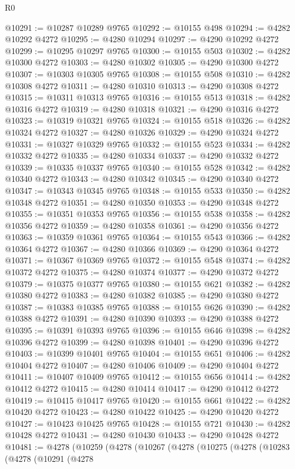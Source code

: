 \begin{lexlean}{R0}
\begin{coremodule}
@10291 := @10287 @10289 @9765
@10292 := @10155 @498
@10294 := @4282 @10292 @4272
@10295 := @4280 @10294
@10297 := @4290 @10292 @4272
@10299 := @10295 @10297 @9765
@10300 := @10155 @503
@10302 := @4282 @10300 @4272
@10303 := @4280 @10302
@10305 := @4290 @10300 @4272
@10307 := @10303 @10305 @9765
@10308 := @10155 @508
@10310 := @4282 @10308 @4272
@10311 := @4280 @10310
@10313 := @4290 @10308 @4272
@10315 := @10311 @10313 @9765
@10316 := @10155 @513
@10318 := @4282 @10316 @4272
@10319 := @4280 @10318
@10321 := @4290 @10316 @4272
@10323 := @10319 @10321 @9765
@10324 := @10155 @518
@10326 := @4282 @10324 @4272
@10327 := @4280 @10326
@10329 := @4290 @10324 @4272
@10331 := @10327 @10329 @9765
@10332 := @10155 @523
@10334 := @4282 @10332 @4272
@10335 := @4280 @10334
@10337 := @4290 @10332 @4272
@10339 := @10335 @10337 @9765
@10340 := @10155 @528
@10342 := @4282 @10340 @4272
@10343 := @4280 @10342
@10345 := @4290 @10340 @4272
@10347 := @10343 @10345 @9765
@10348 := @10155 @533
@10350 := @4282 @10348 @4272
@10351 := @4280 @10350
@10353 := @4290 @10348 @4272
@10355 := @10351 @10353 @9765
@10356 := @10155 @538
@10358 := @4282 @10356 @4272
@10359 := @4280 @10358
@10361 := @4290 @10356 @4272
@10363 := @10359 @10361 @9765
@10364 := @10155 @543
@10366 := @4282 @10364 @4272
@10367 := @4280 @10366
@10369 := @4290 @10364 @4272
@10371 := @10367 @10369 @9765
@10372 := @10155 @548
@10374 := @4282 @10372 @4272
@10375 := @4280 @10374
@10377 := @4290 @10372 @4272
@10379 := @10375 @10377 @9765
@10380 := @10155 @621
@10382 := @4282 @10380 @4272
@10383 := @4280 @10382
@10385 := @4290 @10380 @4272
@10387 := @10383 @10385 @9765
@10388 := @10155 @626
@10390 := @4282 @10388 @4272
@10391 := @4280 @10390
@10393 := @4290 @10388 @4272
@10395 := @10391 @10393 @9765
@10396 := @10155 @646
@10398 := @4282 @10396 @4272
@10399 := @4280 @10398
@10401 := @4290 @10396 @4272
@10403 := @10399 @10401 @9765
@10404 := @10155 @651
@10406 := @4282 @10404 @4272
@10407 := @4280 @10406
@10409 := @4290 @10404 @4272
@10411 := @10407 @10409 @9765
@10412 := @10155 @656
@10414 := @4282 @10412 @4272
@10415 := @4280 @10414
@10417 := @4290 @10412 @4272
@10419 := @10415 @10417 @9765
@10420 := @10155 @661
@10422 := @4282 @10420 @4272
@10423 := @4280 @10422
@10425 := @4290 @10420 @4272
@10427 := @10423 @10425 @9765
@10428 := @10155 @721
@10430 := @4282 @10428 @4272
@10431 := @4280 @10430
@10433 := @4290 @10428 @4272
@10481 := @4278
    (@10259
      (@4278
        (@10267
          (@4278
            (@10275
              (@4278
                (@10283
                  (@4278
                    (@10291
                      (@4278

\end{coremodule}
\end{lexlean}
